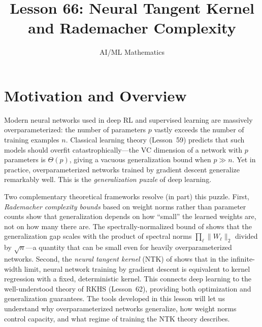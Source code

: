 \documentclass[11pt,a4paper]{article}
\title{Lesson 66: Neural Tangent Kernel and Rademacher Complexity}
\author{AI/ML Mathematics}
\date{}
\begin{document}
\maketitle
\tableofcontents
\newpage

\section{Motivation and Overview}
\label{sec:motivation}

Modern neural networks used in deep RL and supervised learning are
massively overparameterized: the number of parameters $p$ vastly
exceeds the number of training examples $n$.  Classical learning
theory (Lesson~59) predicts that such models should overfit
catastrophically---the VC dimension of a network with $p$ parameters
is $\Theta(p)$, giving a vacuous generalization bound when $p \gg n$.
Yet in practice, overparameterized networks trained by gradient
descent generalize remarkably well.  This is the \emph{generalization
puzzle} of deep learning.

Two complementary theoretical frameworks resolve (in part) this
puzzle.  First, \emph{Rademacher complexity bounds} based on weight
norms rather than parameter counts show that generalization depends
on how ``small'' the learned weights are, not on how many there are.
The spectrally-normalized bound of \citet{bartlett2017} shows that
the generalization gap scales with the product of spectral norms
$\prod_\ell \|W_\ell\|_2$ divided by $\sqrt{n}$---a quantity that
can be small even for heavily overparameterized networks.  Second,
the \emph{neural tangent kernel} (NTK) of \citet{jacot2018} shows
that in the infinite-width limit, neural network training by gradient
descent is equivalent to kernel regression with a fixed, deterministic
kernel.  This connects deep learning to the well-understood theory of
RKHS (Lesson~62), providing both optimization and generalization
guarantees.  The tools developed in this lesson will let us understand
why overparameterized networks generalize, how weight norms control
capacity, and what regime of training the NTK theory describes.
\end{document}
